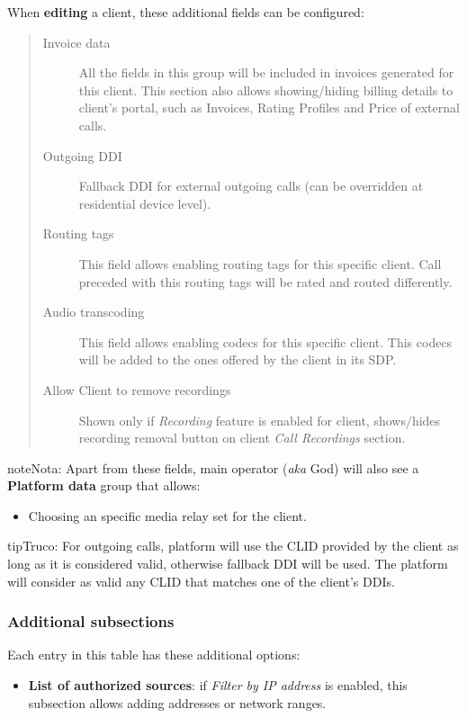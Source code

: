 \documentclass[letterpaper,10pt,spanish]{sphinxmanual}
\begin{document}
When \textbf{editing} a client, these additional fields can be configured:
\begin{quote}
\begin{description}
\item[{Invoice data}] \leavevmode
All the fields in this group will be included in invoices generated for this client. This section also allows
showing/hiding billing details to client's portal, such as Invoices, Rating Profiles and Price of external calls.

\item[{Outgoing DDI}] \leavevmode
Fallback DDI for external outgoing calls (can be overridden at residential device level).

\item[{Routing tags}] \leavevmode
This field allows enabling routing tags for this specific client. Call preceded with this
routing tags will be rated and routed differently.

\item[{Audio transcoding}] \leavevmode
This field allows enabling codecs for this specific client. This codecs will be added to
the ones offered by the client in its SDP.

\item[{Allow Client to remove recordings}] \leavevmode
Shown only if \emph{Recording} feature is enabled for client, shows/hides recording
removal button on client \emph{Call Recordings} section.

\end{description}
\end{quote}

\begin{notice}{note}{Nota:}
Apart from these fields, main operator (\emph{aka} God) will also see a \textbf{Platform data} group that allows:
\begin{itemize}
\item {} 
Choosing an specific media relay set for the client.

\end{itemize}
\end{notice}

\begin{notice}{tip}{Truco:}
For outgoing calls, platform will use the CLID provided by the client as long as it is considered valid, otherwise fallback DDI
will be used. The platform will consider as valid any CLID that matches one of the client's DDIs.
\end{notice}


\subsubsection{Additional subsections}
\label{administration_portal/brand/clients/retail:additional-subsections}
Each entry in this table has these additional options:
\begin{itemize}
\item {} 
\textbf{List of authorized sources}: if \emph{Filter by IP address} is enabled, this subsection allows adding addresses or network ranges.

\end{itemize}
\end{document}
